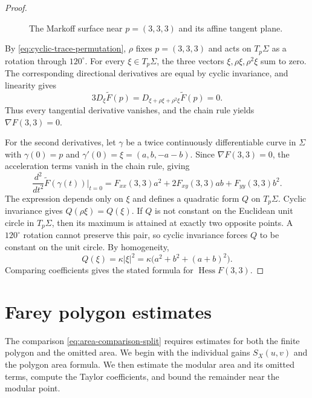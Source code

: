 \documentclass[10pt,twoside]{article}
\theoremstyle{plain}
\theoremstyle{definition}
\theoremstyle{remark}
\DeclareMathOperator{\Hess}{Hess}
\begin{document}
\begin{proof}
\begin{figure}[ht]

\caption{
The Markoff surface near $p=(3,3,3)$ and its affine tangent
plane.
}
\label{fig:markoff-surface-tangent-plane}
\end{figure}

By \eqref{eq:cyclic-trace-permutation}, $\rho$ fixes $p=(3,3,3)$
and acts on $T_p\Sigma$ as a rotation through $120^\circ$.
For every $\xi\in T_p\Sigma$, the three vectors
$\xi,\rho\xi,\rho^2\xi$ sum to zero. The corresponding directional
derivatives are equal by cyclic invariance, and linearity gives
$$
3D_\xi\widetilde F(p)
=
D_{\xi+\rho\xi+\rho^2\xi}\widetilde F(p)
=
0.
$$
Thus every tangential derivative vanishes, and the chain rule yields
$\nabla F(3,3)=0$.

For the second derivatives, let $\gamma$ be a twice continuously
differentiable curve in $\Sigma$ with $\gamma(0)=p$ and
$\gamma'(0)=\xi=(a,b,-a-b)$. Since $\nabla F(3,3)=0$,
the acceleration terms vanish in the chain rule, giving
$$
\frac{d^2}{dt^2}\widetilde F(\gamma(t))\bigg|_{t=0}
=
F_{xx}(3,3)a^2+2F_{xy}(3,3)ab+F_{yy}(3,3)b^2.
$$
The expression depends only on $\xi$ and defines a quadratic form
$Q$ on $T_p\Sigma$. Cyclic invariance gives $Q(\rho\xi)=Q(\xi)$.
If $Q$ is not constant on the Euclidean unit circle in $T_p\Sigma$,
then its maximum is attained at exactly two opposite points.
A $120^\circ$ rotation cannot preserve this pair, so cyclic
invariance forces $Q$ to be constant on the unit circle. By homogeneity,
$$
Q(\xi)=\kappa|\xi|^2
=\kappa\bigl(a^2+b^2+(a+b)^2\bigr).
$$
Comparing coefficients gives the stated formula for
$
\Hess F(3,3)
$.
\end{proof}

\section{Farey polygon estimates}
\label{sec:shared-estimates}

The comparison \eqref{eq:area-comparison-split} requires estimates for
both the finite polygon and the omitted area. We begin with the
individual gains $S_X(u,v)$ and the polygon area formula. We then
estimate the modular area and its omitted terms, compute the Taylor
coefficients, and bound the remainder near the modular point.
\end{document}
